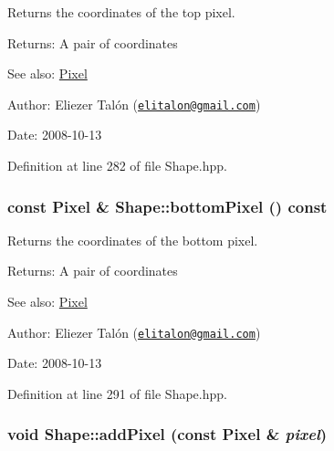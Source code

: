 Returns the coordinates of the top pixel. 

\begin{Desc}
\item[Returns:]A pair of coordinates\end{Desc}
\begin{Desc}
\item[See also:]\hyperlink{_pixel_8hpp_535e59456e3e633842529cfa8ea103c4}{Pixel}\end{Desc}
\begin{Desc}
\item[Author:]Eliezer Talón (\href{mailto:elitalon@gmail.com}{\tt elitalon@gmail.com}) \end{Desc}
\begin{Desc}
\item[Date:]2008-10-13 \end{Desc}


Definition at line 282 of file Shape.hpp.\hypertarget{class_shape_99293804122214fa366d7f7ae794d077}{
\subsubsection[bottomPixel]{\setlength{\rightskip}{0pt plus 5cm}const {\bf Pixel} \& Shape::bottomPixel () const}}
\label{class_shape_99293804122214fa366d7f7ae794d077}


Returns the coordinates of the bottom pixel. 

\begin{Desc}
\item[Returns:]A pair of coordinates\end{Desc}
\begin{Desc}
\item[See also:]\hyperlink{_pixel_8hpp_535e59456e3e633842529cfa8ea103c4}{Pixel}\end{Desc}
\begin{Desc}
\item[Author:]Eliezer Talón (\href{mailto:elitalon@gmail.com}{\tt elitalon@gmail.com}) \end{Desc}
\begin{Desc}
\item[Date:]2008-10-13 \end{Desc}


Definition at line 291 of file Shape.hpp.\hypertarget{class_shape_f6114234203d9473f1fef9e6391f9243}{
\subsubsection[addPixel]{\setlength{\rightskip}{0pt plus 5cm}void Shape::addPixel (const {\bf Pixel} \& {\em pixel})}}
\label{class_shape_f6114234203d9473f1fef9e6391f9243}


